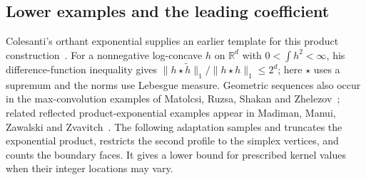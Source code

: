 \subsection{Lower examples and the leading coefficient}

Colesanti's orthant exponential supplies an earlier template for this
product construction~\cite[Theorems~1.1--1.2]{colesanti}.
For a nonnegative log-concave $h$ on $\mathbb R^d$ with
$0<\int h^2<\infty$, his difference-function inequality gives
$\|h\star\widetilde h\|_1/\|h\star h\|_1\le2^d$;
here $\star$ uses a supremum and the norms use Lebesgue measure.
Geometric sequences also occur in the max-convolution examples
of Matolcsi, Ruzsa, Shakan and Zhelezov~\cite[Example~11.2]{mrsz};
related reflected product-exponential examples appear in Madiman,
Manui, Zawalski and Zvavitch~\cite[Lemma~A.3]{mmmz}.
The following adaptation samples and truncates the exponential product,
restricts the second profile to the simplex vertices, and counts the
boundary faces. It gives a lower bound for prescribed kernel values
when their integer locations may vary.

